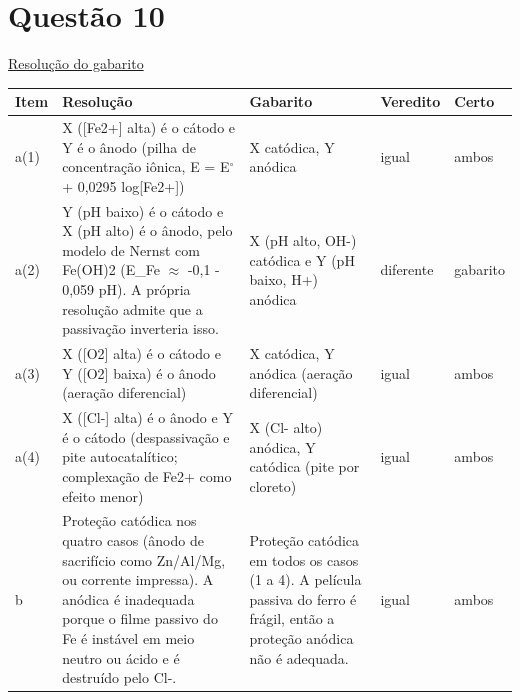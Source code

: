 \documentclass{article}%
\begin{document}
\section*{Questão 10}%
\href{https://poliedroresolve.sistemapoliedro.com.br/vestibulares/ita/2027/ita-2-fase-dia-2-21-10-2026-2-fase-dia-2/dissertativa-10-quimica-2-fase-dia-2-ita-2027}{Resolução do gabarito}\par\smallskip%
\begin{longtable}{@{}p{} p{} p{} p{} p{}@{}}\toprule Item & Resolução & Gabarito & Veredito & Certo \\ \midrule
a(1) & X ({[}Fe2+{]} alta) é o cátodo e Y é o ânodo (pilha de concentração iônica, E = E$^\circ$ + 0,0295 log{[}Fe2+{]}) & X catódica, Y anódica & igual & ambos \\
a(2) & Y (pH baixo) é o cátodo e X (pH alto) é o ânodo, pelo modelo de Nernst com Fe(OH)2 (E\_Fe $\approx$ -0,1 - 0,059 pH). A própria resolução admite que a passivação inverteria isso. & X (pH alto, OH-) catódica e Y (pH baixo, H+) anódica & diferente & gabarito \\
a(3) & X ({[}O2{]} alta) é o cátodo e Y ({[}O2{]} baixa) é o ânodo (aeração diferencial) & X catódica, Y anódica (aeração diferencial) & igual & ambos \\
a(4) & X ({[}Cl-{]} alta) é o ânodo e Y é o cátodo (despassivação e pite autocatalítico; complexação de Fe2+ como efeito menor) & X (Cl- alto) anódica, Y catódica (pite por cloreto) & igual & ambos \\
b & Proteção catódica nos quatro casos (ânodo de sacrifício como Zn/Al/Mg, ou corrente impressa). A anódica é inadequada porque o filme passivo do Fe é instável em meio neutro ou ácido e é destruído pelo Cl-. & Proteção catódica em todos os casos (1 a 4). A película passiva do ferro é frágil, então a proteção anódica não é adequada. & igual & ambos \\
\bottomrule\end{longtable}%
\end{document}
